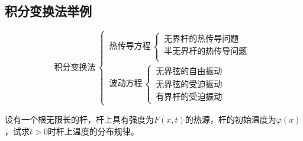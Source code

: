 \subsection{积分变换法举例}
\begin{equation*}
	\mbox{积分变换法} \, 
	\begin{cases}
		\, \mbox{热传导方程} \,
		\begin{cases}
			\, \mbox{无界杆的热传导问题}\\
			\, \mbox{半无界杆的热传导问题}\\
		\end{cases}
		\\
		\, \mbox{波动方程} \,
		\begin{cases}
			\, \mbox{无界弦的自由振动}\\
			\, \mbox{无界弦的受迫振动}\\
			\, \mbox{有界杆的受迫振动}
		\end{cases}
	\end{cases}
\end{equation*}
\vspace*{1em}

\example[无界杆上的热传导问题]
设有一个根无限长的杆，杆上具有强度为$F(x,t)$的热源，杆的初始温度为$\varphi(x)$，试求$t>0$时杆上温度的分布规律。

